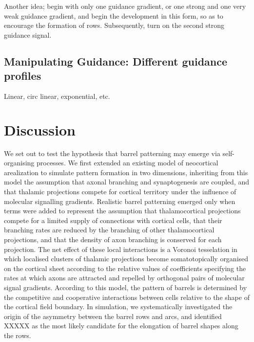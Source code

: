 \documentclass[a4paper,11pt]{article}
\newcommand{\mb}[1]{\mathbf{#1}}
\begin{document}
Another idea; begin with only one guidance gradient, or one strong and
one very weak guidance gradient, and begin the development in this
form, so as to encourage the formation of rows. Subsequently, turn on
the second strong guidance signal.

\subsection*{Manipulating Guidance: Different guidance profiles}

Linear, circ linear, exponential, etc.





\section*{Discussion}

We set out to test the hypothesis that barrel patterning may emerge via
self-organising processes. We first extended an existing model of neocortical
arealization to simulate pattern formation in two dimensions, inheriting from
this model the assumption that axonal branching and synaptogenesis are
coupled, and that thalamic projections compete for cortical territory under
the influence of molecular signalling gradients. Realistic barrel patterning
emerged only when terms were added to represent the assumption that
thalamocortical projections compete for a limited supply of connections with
cortical cells, that their branching rates are reduced by the branching of
other thalamocortical projections, and that the density of axon branching is
conserved for each projection. The net effect of these local interactions is a
Voronoi tesselation in which localised clusters of thalamic projections become
somatotopically organised on the cortical sheet according to the relative
values of coefficients specifying the rates at which axons are attracted and
repelled by orthogonal pairs of molecular signal gradients. According to this
model, the pattern of barrels is determined by the competitive and cooperative
interactions between cells relative to the shape of the cortical field
boundary. In simulation, we systematically investigated the origin of the
asymmetry between the barrel rows and arcs, and identified {\color{red} XXXXX}
as the most likely candidate for the elongation of barrel shapes along the
rows.


\end{document}
